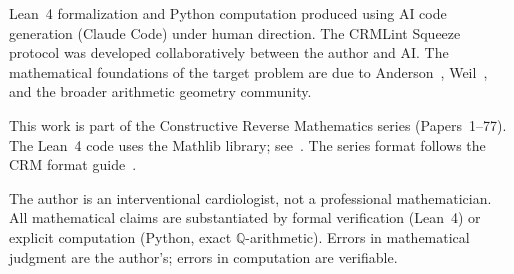 \documentclass[11pt]{article}
\theoremstyle{plain}
\theoremstyle{definition}
\theoremstyle{remark}
\newcommand{\Q}{\mathbb{Q}}
\begin{document}
Lean~4 formalization and Python computation produced using AI code
generation (Claude Code) under human direction.  The CRMLint
Squeeze protocol was developed collaboratively between the author
and AI.  The mathematical foundations of the target problem are
due to Anderson~\cite{Anderson1993}, Weil~\cite{Weil1977}, and the
broader arithmetic geometry community.

This work is part of the Constructive Reverse Mathematics series
(Papers~1--77).  The Lean~4 code uses the Mathlib library;
see~\cite{Mathlib4}.  The series format follows the CRM format
guide~\cite{FormatGuide}.

The author is an interventional cardiologist, not a professional
mathematician.  All mathematical claims are substantiated by
formal verification (Lean~4) or explicit computation (Python,
exact $\Q$-arithmetic).  Errors in mathematical judgment are the
author's; errors in computation are verifiable.
\end{document}
